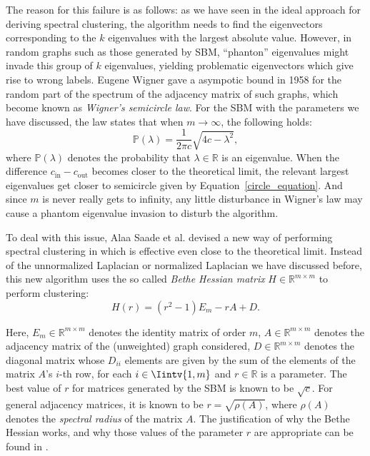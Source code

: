 The reason for this failure is as follows: as we have seen in the ideal approach for deriving spectral clustering, the algorithm needs to find the eigenvectors corresponding to the $k$ eigenvalues with the largest absolute value.
However, in random graphs such as those generated by SBM, ``phanton'' eigenvalues might invade this group of $k$ eigenvalues, yielding problematic eigenvectors which give rise to wrong labels.
Eugene Wigner gave a asympotic bound in 1958 \cite{circle} for the random part of the spectrum of the adjacency matrix of such graphs, which become known as \textit{Wigner's semicircle law}. 
For the SBM with the parameters we have discussed, the law states that when $m \rightarrow \infty$, the following holds:
\begin{equation} \label{circle_equation}
   \mathbb P (\lambda) = \frac{1}{2 \pi c} \sqrt{4c - \lambda^2},
\end{equation}
where $\mathbb P (\lambda)$ denotes the probability that $\lambda \in \mathbb R$ is an eigenvalue.
When the difference $c_\text{in} - c_\text{out}$ becomes closer to the theoretical limit, the relevant largest eigenvalues get closer to semicircle given by Equation~\vref{circle_equation}.
And since $m$ is never really gets to infinity, any little disturbance in Wigner's law may cause a phantom eigenvalue invasion to disturb the algorithm.

To deal with this issue, Alaa Saade et al. devised a new way of performing spectral clustering in \cite{bethe} which is effective even close to the theoretical limit. 
Instead of the unnormalized Laplacian or normalized Laplacian we have discussed before, this new algorithm uses the so called \textit{Bethe Hessian matrix} $H \in \mathbb R ^{m \times m}$ to perform clustering:
\begin{equation}\label{bethe_definition}
   H(r) = (r^2 - 1) E_m -r A + D.
\end{equation}

Here, $E_m \in \mathbb R^{m \times m}$ denotes the identity matrix of order $m$, $A \in \mathbb R^{m \times m}$ denotes the adjacency matrix of the (unweighted) graph considered, $D \in \mathbb R^{m \times m}$ denotes the diagonal matrix whose $D_{ii}$ elements are given by the sum of the elements of the matrix $A$'s $i$-th row, for each $i \in \Iintv{1,m}$ and $r \in \mathbb R$ is a parameter.
The best value of $r$ for matrices generated by the SBM is known to be $\sqrt{c}$.
For general adjacency matrices, it is known to be $r = \sqrt{\rho {(A)}}$, where $\rho (A)$ denotes the \textit{spectral radius} of the matrix $A$.
The justification of why the Bethe Hessian works, and why those values of the parameter $r$ are appropriate can be found in \cite{bethe}.

